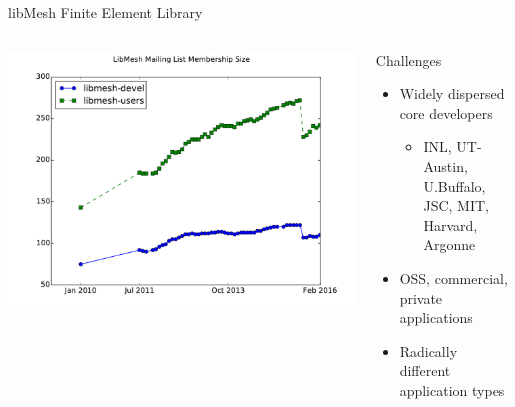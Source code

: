 \documentclass[mathserif]{beamer}
\begin{document}
\begin{frame}{libMesh Finite Element Library}
\begin{columns}
\includegraphics[width=\textwidth]{libmesh_mailinglists_membership}

\begin{block}{Challenges}
\begin{itemize}
\item Widely dispersed core developers
\begin{itemize}
\item INL, UT-Austin, U.Buffalo, JSC, MIT, Harvard, Argonne
\end{itemize}
\item OSS, commercial, private applications
\item Radically different application types
\end{itemize}
\end{block}
\end{columns}

\end{frame}
\end{document}

